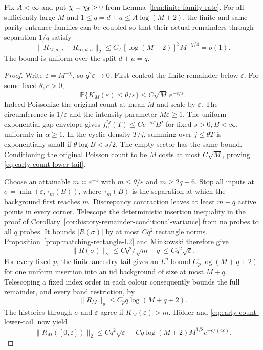 \documentclass[11pt,letterpaper]{article}
\newcommand{\PP}{\mathbb P}\newcommand{\EE}{\mathbb E}
\begin{document}
\begin{proposition}
\label{prop:small-family-remainder-comparison}
Fix $A<\infty$ and put $\chi=\chi_{\rm f}>0$ from
Lemma~\ref{lem:finite-family-rate}. For all sufficiently large
$M$ and $1\le q=d+a\le A\log(M+2)$, the finite and same-parity
entrance families can be coupled so that their actual remainders
through separation $1/q$ satisfy
\begin{equation}\label{eq:small-family-remainder-comparison}
 \|R_{M;d,a}-R_{\infty;d,a}\|_2
       \le C_A[\log(M+2)]^3 M^{-\chi/4}=o(1).
\end{equation}
The bound is uniform over the split $d+a=q$.
\end{proposition}
\begin{proof}
Write $\varepsilon=M^{-\chi}$, so $q^2\varepsilon\to0$.
First control the finite remainder below $\varepsilon$.
For some fixed $\theta,c>0$,
\begin{equation}\label{eq:early-count-lower-tail}
 \PP\{K_M(\varepsilon)\le\theta/\varepsilon\}
                \le C\sqrt M\,e^{-c/\varepsilon}.
\end{equation}
Indeed Poissonize the original count at mean $M$ and scale
by $\varepsilon$. The circumference is $1/\varepsilon$ and
the intensity parameter $M\varepsilon\ge1$. The uniform
exponential gap envelope gives
$f_\alpha^{*j}(T)\le Ce^{-sT}B^j$ for fixed $s>0,B<\infty$,
uniformly in $\alpha\ge1$. In the cyclic density $T/j$,
summing over $j\le\theta T$ is exponentially small if
$\theta\log B<s/2$. The empty sector has the same bound.
Conditioning the original Poisson count to be $M$ costs
at most $C\sqrt M$, proving \eqref{eq:early-count-lower-tail}.

Choose an attainable $m\asymp\varepsilon^{-1}$ with
$m\le\theta/\varepsilon$ and $m\ge2q+6$. Stop all inputs at
$\sigma=\min(\varepsilon,\tau_m(B))$, where $\tau_m(B)$ is
the separation at which the background first reaches $m$.
Discrepancy contraction leaves at least $m-q$ active points
in every corner. Telescope the deterministic insertion
inequality in the proof of
Corollary~\ref{cor:history-remainder-conditional-variance}
from no probes to all $q$ probes. It bounds $|R(\sigma)|$
by at most $Cq^2$ rectangle norms. Proposition~\ref{prop:matching-rectangle-L2}
and Minkowski therefore give
\[
 \|R(\sigma)\|_2\le Cq^2/\sqrt{m-q}
                         \le Cq^2\sqrt\varepsilon.
\]
For every fixed $p$, the finite ancestry tail gives an
$L^p$ bound $C_p\log(M+q+2)$ for one uniform insertion into
an iid background of size at most $M+q$. Telescoping a
fixed index order in each colour consequently bounds the
full remainder, and every band restriction, by
\begin{equation}\label{eq:finite-remainder-crude-moments}
 \|R_M\|_p\le C_pq\log(M+q+2).
\end{equation}
The histories through $\sigma$ and $\varepsilon$ agree if
$K_M(\varepsilon)>m$. H\"older and
\eqref{eq:early-count-lower-tail} now yield
\begin{equation}\label{eq:finite-remainder-small-cutoff}
 \|R_M([0,\varepsilon])\|_2
 \le Cq^2\sqrt\varepsilon
       +Cq\log(M+2)M^{1/8}e^{-c/(4\varepsilon)}.
\end{equation}


\end{proof}
\end{document}
